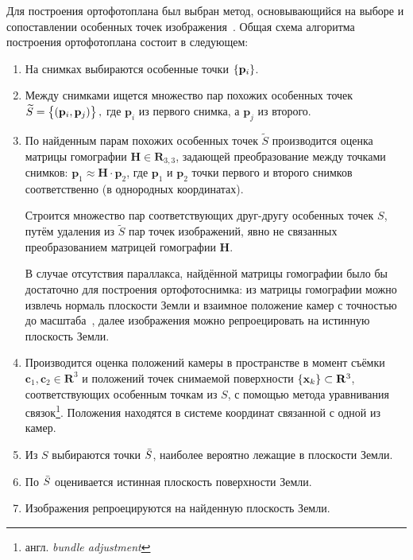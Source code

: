 \documentclass[a4paper,12pt]{article}
\begin{document}
Для построения ортофотоплана был выбран метод, основывающийся на выборе и 
сопоставлении особенных точек изображения~\cite{cham98matchframework, brown03recognising, mclauchlan02mosaic}.
Общая схема алгоритма построения ортофотоплана состоит в следующем:
\begin{enumerate}
  \item На снимках выбираются особенные точки $\cbr{ \mathbf{p}_i }$.
  
  \item Между снимками ищется множество пар похожих особенных 
  точек $\widetilde{S} = \cbr{(\mathbf{p}_i, \mathbf{p}_j )},$
  где $\mathbf{p}_i$ из первого снимка, а $\mathbf{p}_j$ из второго.
  
  \item По найденным парам похожих особенных точек $\widetilde{S}$ производится 
  оценка матрицы гомографии $\mathbf{H} \in \mathbf{R}_{3, 3}$, 
  задающей преобразование между точками снимков: 
  $\mathbf{p}_1 \approx \mathbf{H} \cdot \mathbf{p}_2$, 
  где $\mathbf{p}_1$ и $\mathbf{p}_2$ точки первого и второго снимков 
  соответственно (в однородных координатах). 
  
  Строится множество пар соответствующих друг-другу особенных точек $S$, путём
  удаления из $\widetilde{S}$ пар точек изображений, явно не связанных
  преобразованием матрицей гомографии $\mathbf{H}$.
  
  В случае отсутствия параллакса, найдённой матрицы гомографии было бы достаточно 
  для построения ортофотоснимка: из матрицы гомографии можно извлечь нормаль 
  плоскости Земли и взаимное положение камер с точностью до масштаба~\cite{malis07homodecomp}, 
  далее изображения можно репроецировать на истинную плоскость Земли.
  
  \item Производится оценка положений камеры в пространстве в момент съёмки
  $\mathbf{c}_1, \mathbf{c}_2 \in \mathbf{R}^3$ и
  положений точек снимаемой поверхности $\cbr{ \mathbf{x}_k } \subset \mathbf{R}^3$,
  соответствующих особенным точкам из $S$, с помощью метода уравнивания
  связок\footnote{англ. \textit{bundle adjustment}}.
  Положения находятся в системе координат связанной с одной из камер.
  
  \item Из $S$ выбираются точки $\Bar{S}$, наиболее вероятно лежащие в 
  плоскости Земли.
  
  \item По $\Bar{S}$ оценивается истинная плоскость поверхности Земли.
  
  \item Изображения репроецируются на найденную плоскость Земли.
  
\end{enumerate}
  
\end{document}
